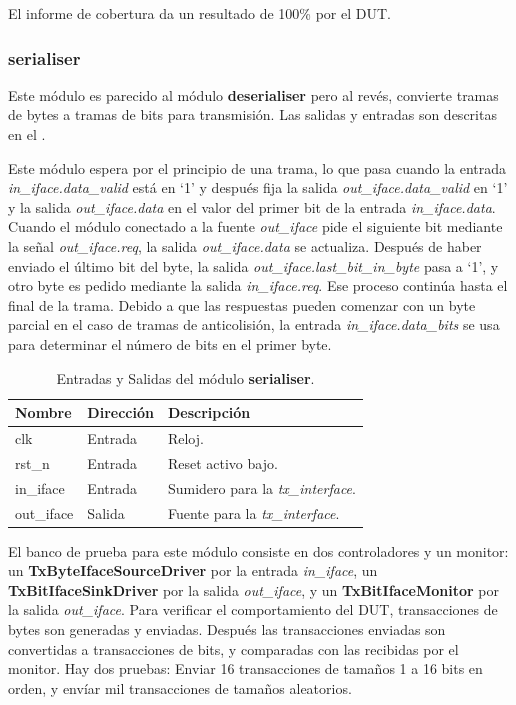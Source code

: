 \documentclass[a4paper, twoside, 11pt]{report}
\begin{document}
El informe de cobertura da un resultado de 100\% por el DUT.

\FloatBarrier
\subsubsection{serialiser}

Este módulo es parecido al módulo \textbf{deserialiser} pero al revés, convierte tramas de bytes a tramas de bits para transmisión. Las salidas y entradas son descritas en el .

Este módulo espera por el principio de una trama, lo que pasa cuando la entrada \textit{in\_iface.data\_valid} está en ‘1’ y después fija la salida \textit{out\_iface.data\_valid} en ‘1’ y la salida \textit{out\_iface.data} en el valor del primer bit de la entrada \textit{in\_iface.data}. Cuando el módulo conectado a la fuente \textit{out\_iface} pide el siguiente bit mediante la señal \textit{out\_iface.req}, la salida \textit{out\_iface.data} se actualiza. Después de haber enviado el último bit del byte, la salida \textit{out\_iface.last\_bit\_in\_byte} pasa a ‘1’, y otro byte es pedido mediante la salida \textit{in\_iface.req}. Ese proceso continúa hasta el final de la trama. Debido a que las respuestas pueden comenzar con un byte parcial en el caso de tramas de anticolisión, la entrada \textit{in\_iface.data\_bits} se usa para determinar el número de bits en el primer byte.


\begin{table}[htb]
  \centering
  \tablezebra
  \begin{tabulary}{\linewidth}{l|l|L}
    \textbf{Nombre}&\textbf{Dirección}&\textbf{Descripción} \\
    \hline
    clk&Entrada&Reloj. \\
    rst\_n&Entrada&Reset activo bajo. \\
    in\_iface&Entrada&Sumidero para la \textit{tx\_interface}. \\
    out\_iface&Salida&Fuente para la \textit{tx\_interface}. \\
  \end{tabulary}
  \caption{Entradas y Salidas del módulo \textbf{serialiser}.}
  \label{tab:ports_serialiser}
\end{table}

El banco de prueba para este módulo consiste en dos controladores y un monitor: un \textbf{TxByteIfaceSourceDriver} por la entrada \textit{in\_iface}, un \textbf{TxBitIfaceSinkDriver} por la salida \textit{out\_iface}, y un \textbf{TxBitIfaceMonitor} por la salida \textit{out\_iface}. Para verificar el comportamiento del DUT, transacciones de bytes son generadas y enviadas. Después las transacciones enviadas son convertidas a transacciones de bits, y comparadas con las recibidas por el monitor. Hay dos pruebas: Enviar 16 transacciones de tamaños 1 a 16 bits en orden, y envíar mil transacciones de tamaños aleatorios.
\end{document}
